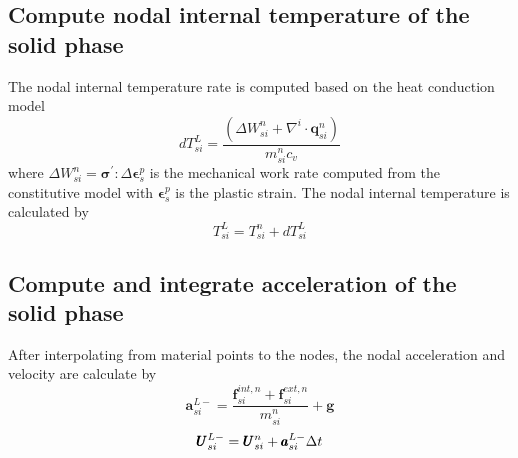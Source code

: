 \documentclass[preprint,12pt]{elsarticle}
\begin{document}
\subsection{\textsf{Compute nodal internal temperature of the solid phase}}
%
%
The nodal internal temperature rate is computed based on the heat conduction model
%
%
\begin{equation}
     dT_{si}^L = \frac{(\Delta W_{si}^n + \nabla^i \cdot \pmb{q}_{si}^n)}{m_{si}^n c_v}
\end {equation}
%
%
where $\Delta W_{si}^n = \pmb{\sigma}^\prime : \Delta \pmb{\epsilon}^p_s$ is the mechanical work rate computed from the constitutive model with $\pmb{\epsilon}^p_s$ is the plastic strain. The nodal internal temperature is calculated by
\begin{equation}
     T_{si}^L = T_{si}^n + dT_{si}^L
\end {equation}
%
%
\subsection{\textsf{Compute and integrate acceleration of the solid phase}}
After interpolating from material points to the nodes, the nodal acceleration and velocity are calculate by
%
%
\begin{equation}
     \pmb{a}_{si}^{L-} = \frac{\pmb{f}_{si}^{int,n} + \pmb{f}_{si}^{ext,n}}{m_{si}^n} + \pmb{g}
\end {equation}
\begin{equation}
     \pmb{U}_{si}^{L-} = \pmb{U}_{si}^n + \pmb{a}_{si}^{L-} \Delta{t}
\end {equation}
%
%
\end{document}

